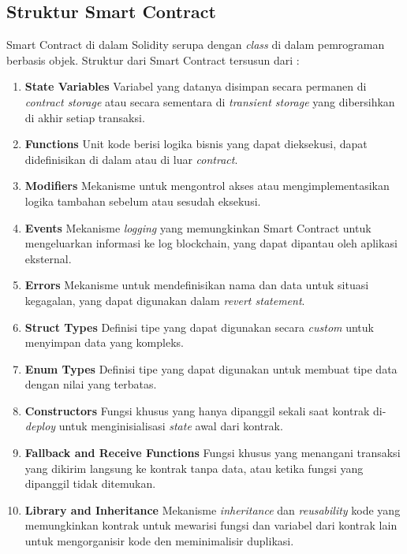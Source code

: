 \subsection{Struktur Smart Contract}
\label{subsec:struktur-smart-contract}

Smart Contract di dalam Solidity serupa dengan \textit{class} di dalam pemrograman berbasis objek. Struktur dari Smart Contract tersusun dari \parencite{solidity_structure}:

\begin{enumerate}
	\item \textbf{State Variables} \newline
	      Variabel yang datanya disimpan secara permanen di \textit{contract storage} atau secara sementara di \textit{transient storage} yang dibersihkan di akhir setiap transaksi.
	\item \textbf{Functions} \newline
	      Unit kode berisi logika bisnis yang dapat dieksekusi, dapat didefinisikan di dalam atau di luar \textit{contract}.
	\item \textbf{Modifiers} \newline
	      Mekanisme untuk mengontrol akses atau mengimplementasikan logika tambahan sebelum atau sesudah eksekusi.
	\item \textbf{Events} \newline
	      Mekanisme \textit{logging} yang memungkinkan Smart Contract untuk mengeluarkan informasi ke log blockchain, yang dapat dipantau oleh aplikasi eksternal.
	\item \textbf{Errors} \newline
	      Mekanisme untuk mendefinisikan nama dan data untuk situasi kegagalan, yang dapat digunakan dalam \textit{revert statement}.
	\item \textbf{Struct Types} \newline
	      Definisi tipe yang dapat digunakan secara \textit{custom} untuk menyimpan data yang kompleks.
	\item \textbf{Enum Types} \newline
	      Definisi tipe yang dapat digunakan untuk membuat tipe data dengan nilai yang terbatas.
	\item \textbf{Constructors} \newline
	      Fungsi khusus yang hanya dipanggil sekali saat kontrak di-\textit{deploy} untuk menginisialisasi \textit{state} awal dari kontrak.
	\item \textbf{Fallback and Receive Functions} \newline
	      Fungsi khusus yang menangani transaksi yang dikirim langsung ke kontrak tanpa data, atau ketika fungsi yang dipanggil tidak ditemukan.
	\item \textbf{Library and Inheritance} \newline
	      Mekanisme \textit{inheritance} dan \textit{reusability} kode yang memungkinkan kontrak untuk mewarisi fungsi dan variabel dari kontrak lain untuk mengorganisir kode den meminimalisir duplikasi.
\end{enumerate}
